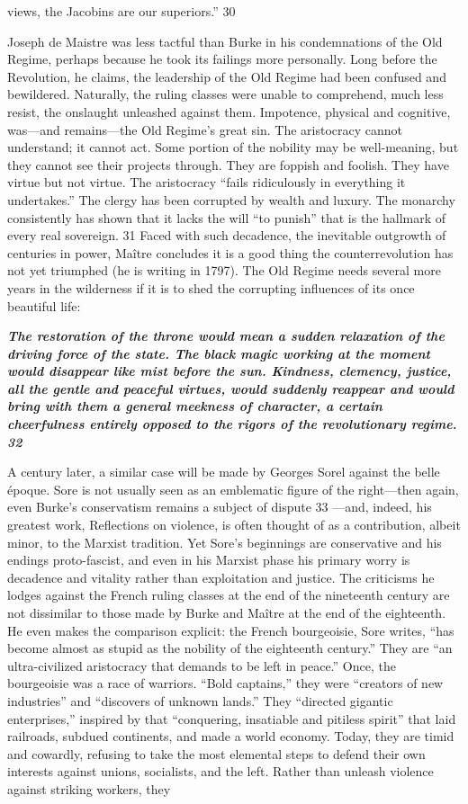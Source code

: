 views, the Jacobins are our superiors.” {\color{blue} 30 } {\par} Joseph de Maistre was less tactful than Burke in his condemnations of the Old Regime, perhaps because he took its failings more personally. Long before the Revolution, he claims, the leadership of the Old Regime had been confused and bewildered. Naturally, the ruling classes were unable to comprehend, much less resist, the onslaught unleashed against them. Impotence, physical and cognitive, was—and remains—the Old Regime’s great sin. The aristocracy cannot understand; it cannot act. Some portion of the nobility may be well-meaning, but they cannot see their projects through. They are foppish and foolish. They have virtue but not virtue. The aristocracy “fails ridiculously in everything it undertakes.” The clergy has been corrupted by wealth and luxury. The monarchy consistently has shown that it lacks the will “to punish” that is the hallmark of every real sovereign. {\color{blue} 31 } Faced with such decadence, the inevitable outgrowth of centuries in power, Maître concludes it is a good thing the counterrevolution has not yet triumphed (he is writing in 1797). The Old Regime needs several more years in the wilderness if it is to shed the corrupting influences of its once beautiful life:{\par} {\textbf{\textit{The restoration of the throne would mean a sudden relaxation of the driving force of the state. The black magic working at the moment would disappear like mist before the sun. Kindness, clemency, justice, all the gentle and peaceful virtues, would suddenly reappear and would bring with them a general meekness of character, a certain cheerfulness entirely opposed to the rigors of the revolutionary regime. {\color{blue} 32 } } } }{\par} A century later, a similar case will be made by Georges Sorel against the belle époque. Sore is not usually seen as an emblematic figure of the right—then again, even Burke’s conservatism remains a subject of dispute {\color{blue} 33 } —and, indeed, his greatest work, Reflections on violence, is often thought of as a contribution, albeit minor, to the Marxist tradition. Yet Sore’s beginnings are conservative and his endings proto-fascist, and even in his Marxist phase his primary worry is decadence and vitality rather than exploitation and justice. The criticisms he lodges against the French ruling classes at the end of the nineteenth century are not dissimilar to those made by Burke and Maître at the end of the eighteenth. He even makes the comparison explicit: the French bourgeoisie, Sore writes, “has become almost as stupid as the nobility of the eighteenth century.” They are “an ultra-civilized aristocracy that demands to be left in peace.” Once, the bourgeoisie was a race of warriors. “Bold captains,” they were “creators of new industries” and “discovers of unknown lands.” They “directed gigantic enterprises,” inspired by that “conquering, insatiable and pitiless spirit” that laid railroads, subdued continents, and made a world economy. Today, they are timid and cowardly, refusing to take the most elemental steps to defend their own interests against unions, socialists, and the left. Rather than unleash violence against striking workers, they 